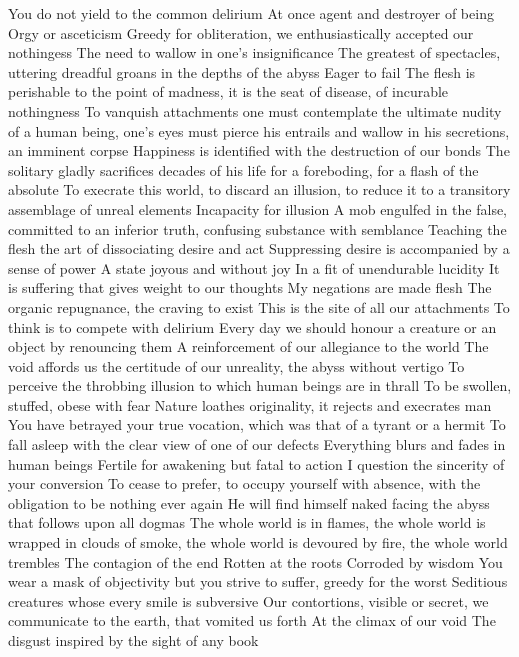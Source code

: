 \documentclass{article}
\begin{document}
You do not yield to the common delirium
At once agent and destroyer of being
Orgy or asceticism
Greedy for obliteration, we enthusiastically accepted our nothingess
The need to wallow in one's insignificance
The greatest of spectacles, uttering dreadful groans in the depths of the abyss
Eager to fail
The flesh is perishable to the point of madness, it is the seat of disease, of incurable nothingness
To vanquish attachments one must contemplate the ultimate nudity of a human being, one's eyes must pierce his entrails and wallow in his secretions, an imminent corpse
Happiness is identified with the destruction of our bonds
The solitary gladly sacrifices decades of his life for a foreboding, for a flash of the absolute
To execrate this world, to discard an illusion, to reduce it to a transitory assemblage of unreal elements
Incapacity for illusion
A mob engulfed in the false, committed to an inferior truth, confusing substance with semblance
Teaching the flesh the art of dissociating desire and act
Suppressing desire is accompanied by a sense of power
A state joyous and without joy
In a fit of unendurable lucidity
It is suffering that gives weight to our thoughts
My negations are made flesh
The organic repugnance, the craving to exist
This is the site of all our attachments
To think is to compete with delirium
Every day we should honour a creature or an object by renouncing them
A reinforcement of our allegiance to the world
The void affords us the certitude of our unreality, the abyss without vertigo
To perceive the throbbing illusion to which human beings are in thrall
To be swollen, stuffed, obese with fear
Nature loathes originality, it rejects and execrates man
You have betrayed your true vocation, which was that of a tyrant or a hermit
To fall asleep with the clear view of one of our defects
Everything blurs and fades in human beings
Fertile for awakening but fatal to action
I question the sincerity of your conversion
To cease to prefer, to occupy yourself with absence, with the obligation to be nothing ever again
He will find himself naked facing the abyss that follows upon all dogmas
The whole world is in flames, the whole world is wrapped in clouds of smoke, the whole world is devoured by fire, the whole world trembles
The contagion of the end
Rotten at the roots
Corroded by wisdom
You wear a mask of objectivity but you strive to suffer, greedy for the worst
Seditious creatures whose every smile is subversive
Our contortions, visible or secret, we communicate to the earth, that vomited us forth
At the climax of our void
The disgust inspired by the sight of any book
\end{document}
